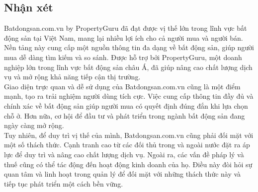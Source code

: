 \subsection{Nhận xét}
\hspace*{1cm}Batdongsan.com.vn by PropertyGuru đã đạt được vị thế lớn trong lĩnh vực bất động sản tại Việt Nam, mang lại nhiều lợi ích cho cả người mua và người bán. Nền tảng này cung cấp một nguồn thông tin đa dạng về bất động sản, giúp người mua dễ dàng tìm kiếm và so sánh. Được hỗ trợ bởi PropertyGuru, một doanh nghiệp lớn trong lĩnh vực bất động sản châu Á, đã giúp nâng cao chất lượng dịch vụ và mở rộng khả năng tiếp cận thị trường.\\
\hspace*{1cm}Giao diện trực quan và dễ sử dụng của Batdongsan.com.vn cũng là một điểm mạnh, tạo ra trải nghiệm người dùng tích cực. Việc cung cấp thông tin đầy đủ và chính xác về bất động sản giúp người mua có quyết định đúng đắn khi lựa chọn chỗ ở. Hơn nữa, cơ hội để đầu tư và phát triển trong ngành bất động sản đang ngày càng mở rộng.\\
\hspace*{1cm}Tuy nhiên, để duy trì vị thế của mình, Batdongsan.com.vn cũng phải đối mặt với một số thách thức. Cạnh tranh cao từ các đối thủ trong và ngoài nước đặt ra áp lực để duy trì và nâng cao chất lượng dịch vụ. Ngoài ra, các vấn đề pháp lý và thuế cũng có thể tác động đến hoạt động kinh doanh của họ. Điều này đòi hỏi sự quan tâm và linh hoạt trong quản lý để đối mặt với những thách thức này và tiếp tục phát triển một cách bền vững.